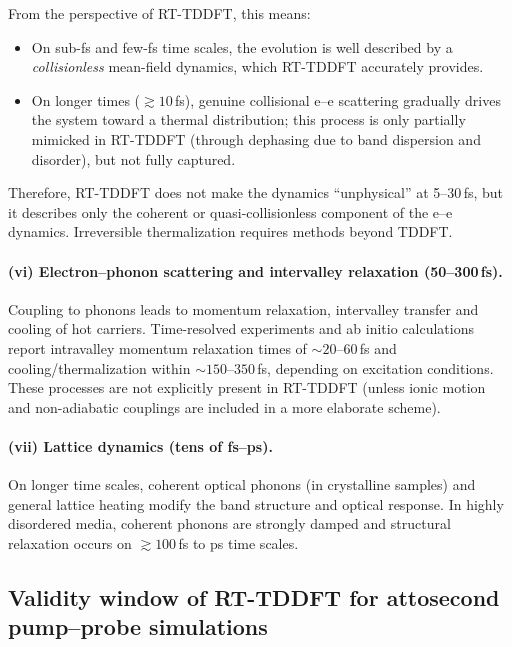 From the perspective of RT-TDDFT, this means:

\begin{itemize}
  \item On sub-fs and few-fs time scales, the evolution is well described by a \emph{collisionless} mean-field dynamics, which RT-TDDFT accurately provides.
  \item On longer times ($\gtrsim 10$\,fs), genuine collisional e--e scattering gradually drives the system toward a thermal distribution; this process is only partially mimicked in RT-TDDFT (through dephasing due to band dispersion and disorder), but not fully captured.
\end{itemize}

Therefore, RT-TDDFT does not make the dynamics ``unphysical'' at 5--30\,fs, but it describes only the coherent or quasi-collisionless component of the e--e dynamics.
Irreversible thermalization requires methods beyond TDDFT.

\paragraph{(vi) Electron--phonon scattering and intervalley relaxation (50--300\,fs).}
Coupling to phonons leads to momentum relaxation, intervalley transfer and cooling of hot carriers.
Time-resolved experiments and ab initio calculations report intravalley momentum relaxation times of $\sim 20$--$60$\,fs and cooling/thermalization within $\sim 150$--$350$\,fs, depending on excitation conditions.\cite{Cushing2018,Worle2021,Tanimura2019,Bernardi2014}
These processes are not explicitly present in RT-TDDFT (unless ionic motion and non-adiabatic couplings are included in a more elaborate scheme).

\paragraph{(vii) Lattice dynamics (tens of fs--ps).}
On longer time scales, coherent optical phonons (in crystalline samples) and general lattice heating modify the band structure and optical response.\cite{Otobe2010,Shinohara2010}
In highly disordered media, coherent phonons are strongly damped and structural relaxation occurs on $\gtrsim 100$\,fs to ps time scales.

\subsection{Validity window of RT-TDDFT for attosecond pump--probe simulations}

